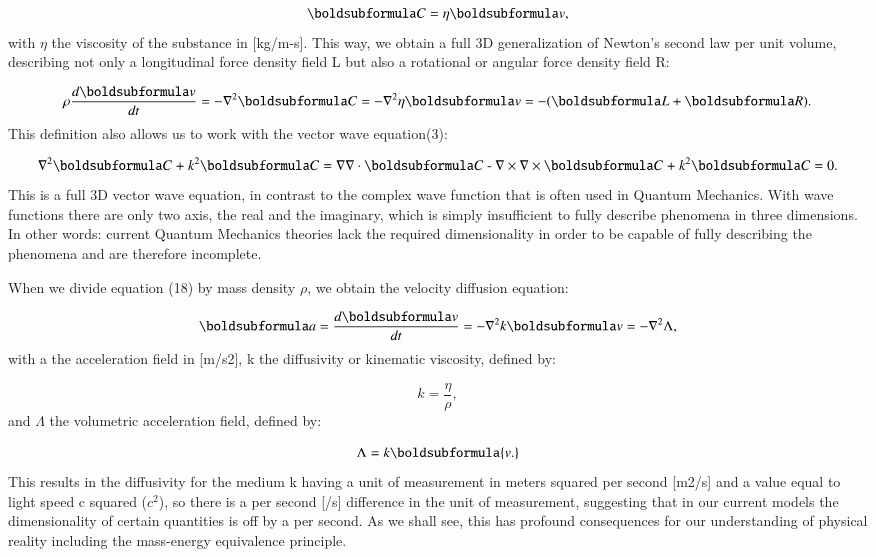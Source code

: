 \documentclass[twoside,final]{article}
\begin{document}
{\begin{equation}
\boldsubformula C=\eta \boldsubformula v,
\end{equation}
with $\eta $ the viscosity of the substance in [kg/m-s]. This way, we obtain a
full 3D generalization of Newton's second law per unit volume, describing not
only a longitudinal force density field L but also a rotational or angular force
density field R: 

\begin{equation}\label{seq:refText18}
\rho \frac{d\boldsubformula v}{\mathit{dt}}=-{\nabla}^2\boldsubformula C=-{\nabla}^2\eta \boldsubformula
v=-(\boldsubformula L+\boldsubformula R).
\end{equation}
This definition also allows us to work with the vector wave equation(3):

\begin{equation}
{\nabla}^2\boldsubformula C\text{ + }k^2\boldsubformula C=\nabla \nabla \cdot \boldsubformula C\text{ - }\nabla \times
\nabla \times \boldsubformula C\text{ + }k^2\boldsubformula C=0.
\end{equation}
This is a full 3D vector wave equation, in contrast to the complex wave function
that is often used in Quantum Mechanics. With wave functions there are only two
axis, the real and the imaginary, which is simply insufficient to fully describe
phenomena in three dimensions. In other words: current Quantum Mechanics
theories lack the required dimensionality in order to be capable of fully
describing the phenomena and are therefore incomplete. 

When we divide equation (18) by mass density $\rho $, we obtain the velocity
diffusion equation:

\begin{equation}\label{seq:refText20}
\boldsubformula a=\frac{d\boldsubformula v}{\mathit{dt}}=-{\nabla}^2k\boldsubformula v=-{\nabla}^2\Lambda ,
\end{equation}
with a the acceleration field in [m/s2], k the diffusivity or kinematic
viscosity, defined by:

\begin{equation}
k=\frac{\eta }{\rho },
\end{equation}
and $\Lambda $ the volumetric acceleration field, defined by: 

\begin{equation}
\Lambda =k\boldsubformula{\mathit{v.}}
\end{equation}
This results in the diffusivity for the medium k having a unit of measurement in
meters squared per second [m2/s] and a value equal to light speed c squared
($c^2$), so there is a per second [/s] difference in the unit of measurement,
suggesting that in our current models the dimensionality of certain quantities
is off by a per second. As we shall see, this has profound consequences for our
understanding of physical reality including the mass-energy equivalence
principle. 

}
\end{document}
